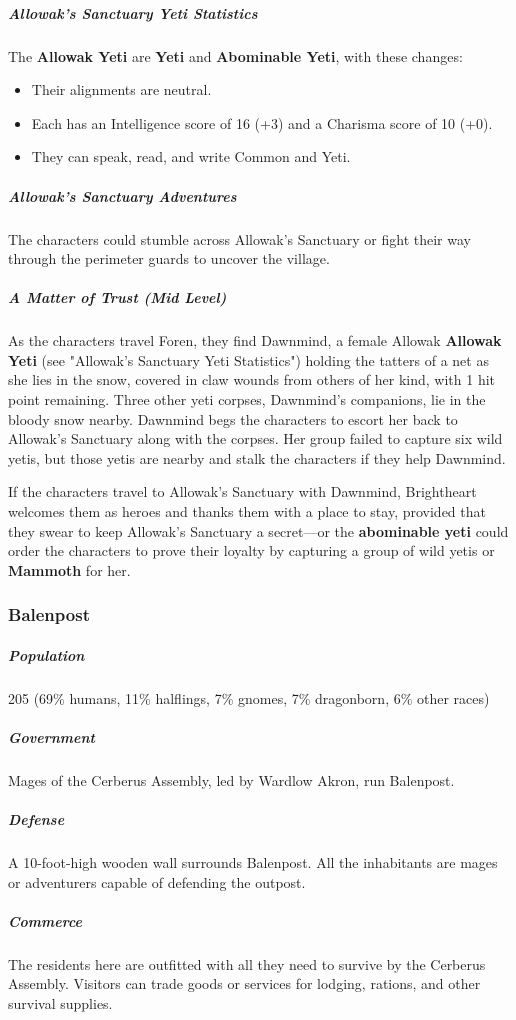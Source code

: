 \documentclass[10pt,a4paper,twoside,bg=print,twocolumn,openany,nodeprecatedcode]{dndbook}
\begin{document}
\subparagraph{Allowak's Sanctuary Yeti Statistics}
The \textbf{Allowak Yeti} are \textbf{Yeti} and \textbf{Abominable Yeti}, with these changes:


\begin{itemize}
\item Their alignments are neutral.
\item Each has an Intelligence score of 16 (+3) and a Charisma score of 10 (+0).
\item They can speak, read, and write Common and Yeti.
\end{itemize}

\subparagraph{Allowak's Sanctuary Adventures}
The characters could stumble across Allowak's Sanctuary or fight their way through the perimeter guards to uncover the village.

\subparagraph{A Matter of Trust (Mid Level)}
As the characters travel Foren, they find Dawnmind, a female Allowak \textbf{Allowak Yeti} (see "Allowak's Sanctuary Yeti Statistics") holding the tatters of a net as she lies in the snow, covered in claw wounds from others of her kind, with 1 hit point remaining. Three other yeti corpses, Dawnmind's companions, lie in the bloody snow nearby. Dawnmind begs the characters to escort her back to Allowak's Sanctuary along with the corpses. Her group failed to capture six wild yetis, but those yetis are nearby and stalk the characters if they help Dawnmind.

If the characters travel to Allowak's Sanctuary with Dawnmind, Brightheart welcomes them as heroes and thanks them with a place to stay, provided that they swear to keep Allowak's Sanctuary a secret—or the \textbf{abominable yeti} could order the characters to prove their loyalty by capturing a group of wild yetis or \textbf{Mammoth} for her.

\subsubsection{Balenpost}
\subparagraph{Population}
205 (69\% humans, 11\% halflings, 7\% gnomes, 7\% dragonborn, 6\% other races)

\subparagraph{Government}
Mages of the Cerberus Assembly, led by Wardlow Akron, run Balenpost.

\subparagraph{Defense}
A 10-foot-high wooden wall surrounds Balenpost. All the inhabitants are mages or adventurers capable of defending the outpost.

\subparagraph{Commerce}
The residents here are outfitted with all they need to survive by the Cerberus Assembly. Visitors can trade goods or services for lodging, rations, and other survival supplies.
\end{document}
